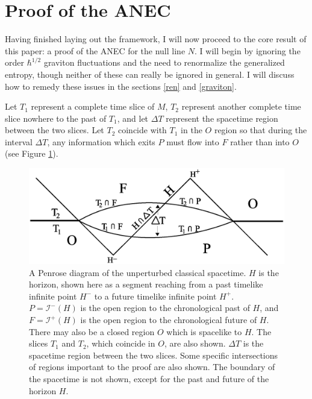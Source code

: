 \documentclass[11pt]{article}
\begin{document}
\section{Proof of the ANEC}\label{proof}

Having finished laying out the framework, I will now proceed to the core result of this paper: a proof of the ANEC for the null line $N$.  I will begin by ignoring the order $\hbar^{1/2}$ graviton fluctuations and the need to renormalize the generalized entropy, though neither of these can really be ignored in general.  I will discuss how to remedy these issues in the sections \ref{ren} and \ref{graviton}.

Let $T_1$ represent a complete time slice of $M$, $T_2$ represent another complete time slice nowhere to the past of $T_1$, and let $\Delta T$ represent the spacetime region between the two slices.  Let $T_2$ coincide with $T_1$ in the $O$ region so that during the interval $\Delta T$, any information which exits $P$ must flow into $F$ rather than into $O$ (see Figure \ref{causal}).

\begin{figure}[ht]
\centering
\includegraphics[width=\textwidth]{causal.eps}
\caption{\small{A Penrose diagram of the unperturbed classical spacetime.  $H$ is the horizon, shown here as a segment reaching from a past timelike infinite point $H^-$ to a future timelike infinite point $H^+$.  $P = \mathcal{I}^-(H)$ is the open region to the chronological past of $H$, and $F = \mathcal{I}^+(H)$ is the open region to the chronological future of $H$.  There may also be a closed region $O$ which is spacelike to $H$.  The slices $T_1$ and $T_2$, which coincide in $O$, are also shown.  $\Delta T$ is the spacetime region between the two slices.  Some specific intersections of regions important to the proof are also shown.  The boundary of the spacetime is not shown, except for the past and future of the horizon $H$.}}\label{causal}
\end{figure}
\end{document}
